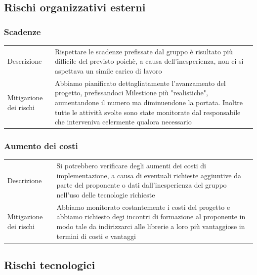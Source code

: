 \documentclass{article}
\begin{document}
\subsection{Rischi organizzativi esterni}
\subsubsection{Scadenze}
\begin{center}
\begin{tabular}{P{10em} P{20em}} 
     Descrizione & Rispettare le scadenze prefissate dal gruppo è risultato più difficile del previsto poichè, a causa dell'inesperienza, non ci si aspettava un simile carico di lavoro \\ 
    Mitigazione dei rischi &  Abbiamo pianificato dettagliatamente l'avanzamento del progetto, prefissandoci Milestione più "realistiche", aumentandone il numero ma diminuendone la portata. Inoltre tutte le attività svolte sono state monitorate dal responsabile che interveniva celermente qualora necessario\\
\end{tabular}
\end{center}

\subsubsection{Aumento dei costi}
\begin{center}
\begin{tabular}{P{10em} P{20em}} 
     Descrizione &  Si potrebbero verificare degli aumenti dei costi di implementazione, a causa di eventuali richieste aggiuntive da parte del proponente o dati dall'inesperienza del gruppo nell'uso delle tecnologie richieste\\ 
    Mitigazione dei rischi &  Abbiamo monitorato costantemente i costi del progetto e abbiamo richiesto degi incontri di formazione al proponente in modo tale da indirizzarci alle librerie a loro più vantaggiose in termini di costi e vantaggi\\
\end{tabular}
\end{center}


\subsection{Rischi tecnologici}
\end{document}
